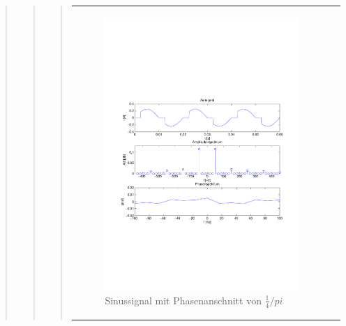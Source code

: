 \begin{quote}
\begin{quote}
\begin{quote}
                \begin{center}
                \begin{tabular}{ll}
    
                \hspace{-11em}
                    \begin{minipage}{0.6\textwidth}
    
                        \begin{figure}[H]
                            \label{fig:}
                            \includegraphics[scale=0.5, trim = 1.5cm 7cm 1.5cm 8.5cm,
                            clip]{./Bilder/Phasenanschnitt28pi.pdf} %
                            \caption{Sinussignal mit Phasenanschnitt von $\frac{1}{4}/pi$}
                        \end{figure}
    

\end{minipage}
\end{tabular}
\end{center}
\end{quote}
\end{quote}
\end{quote}
